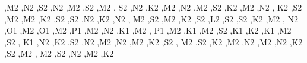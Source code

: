 \begin{DoxyCompactItemize}
\textquotesingle{},\textquotesingle{}M2 \textquotesingle{},\textquotesingle{}N2 \textquotesingle{},\textquotesingle{}S2 \textquotesingle{},\textquotesingle{}N2 \textquotesingle{},\textquotesingle{}M2 \textquotesingle{},\textquotesingle{}S2 \textquotesingle{},\textquotesingle{}M2 \textquotesingle{}, \textquotesingle{}S2 \textquotesingle{},\textquotesingle{}N2 \textquotesingle{},\textquotesingle{}K2 \textquotesingle{},\textquotesingle{}M2 \textquotesingle{},\textquotesingle{}N2 \textquotesingle{},\textquotesingle{}M2 \textquotesingle{},\textquotesingle{}S2 \textquotesingle{},\textquotesingle{}K2 \textquotesingle{},\textquotesingle{}M2 \textquotesingle{},\textquotesingle{}N2 \textquotesingle{}, \textquotesingle{}K2 \textquotesingle{},\textquotesingle{}S2 \textquotesingle{},\textquotesingle{}M2 \textquotesingle{},\textquotesingle{}M2 \textquotesingle{},\textquotesingle{}K2 \textquotesingle{},\textquotesingle{}S2 \textquotesingle{},\textquotesingle{}S2 \textquotesingle{},\textquotesingle{}N2 \textquotesingle{},\textquotesingle{}K2 \textquotesingle{},\textquotesingle{}N2 \textquotesingle{}, \textquotesingle{}M2 \textquotesingle{},\textquotesingle{}S2 \textquotesingle{},\textquotesingle{}M2 \textquotesingle{},\textquotesingle{}K2 \textquotesingle{},\textquotesingle{}S2 \textquotesingle{},\textquotesingle{}L2 \textquotesingle{},\textquotesingle{}S2 \textquotesingle{},\textquotesingle{}S2 \textquotesingle{},\textquotesingle{}K2 \textquotesingle{},\textquotesingle{}M2 \textquotesingle{}, \textquotesingle{}N2 \textquotesingle{},\textquotesingle{}O1 \textquotesingle{},\textquotesingle{}M2 \textquotesingle{},\textquotesingle{}O1 \textquotesingle{},\textquotesingle{}M2 \textquotesingle{},\textquotesingle{}P1 \textquotesingle{},\textquotesingle{}M2 \textquotesingle{},\textquotesingle{}N2 \textquotesingle{},\textquotesingle{}K1 \textquotesingle{},\textquotesingle{}M2 \textquotesingle{}, \textquotesingle{}P1 \textquotesingle{},\textquotesingle{}M2 \textquotesingle{},\textquotesingle{}K1 \textquotesingle{},\textquotesingle{}M2 \textquotesingle{},\textquotesingle{}S2 \textquotesingle{},\textquotesingle{}K1 \textquotesingle{},\textquotesingle{}K2 \textquotesingle{},\textquotesingle{}K1 \textquotesingle{},\textquotesingle{}M2 \textquotesingle{},\textquotesingle{}S2 \textquotesingle{}, \textquotesingle{}K1 \textquotesingle{},\textquotesingle{}N2 \textquotesingle{},\textquotesingle{}K2 \textquotesingle{},\textquotesingle{}S2 \textquotesingle{},\textquotesingle{}N2 \textquotesingle{},\textquotesingle{}M2 \textquotesingle{},\textquotesingle{}N2 \textquotesingle{},\textquotesingle{}M2 \textquotesingle{},\textquotesingle{}K2 \textquotesingle{},\textquotesingle{}S2 \textquotesingle{}, \textquotesingle{}M2 \textquotesingle{},\textquotesingle{}S2 \textquotesingle{},\textquotesingle{}K2 \textquotesingle{},\textquotesingle{}M2 \textquotesingle{},\textquotesingle{}N2 \textquotesingle{},\textquotesingle{}M2 \textquotesingle{},\textquotesingle{}N2 \textquotesingle{},\textquotesingle{}K2 \textquotesingle{},\textquotesingle{}S2 \textquotesingle{},\textquotesingle{}M2 \textquotesingle{}, \textquotesingle{}M2 \textquotesingle{},\textquotesingle{}S2 \textquotesingle{},\textquotesingle{}N2 \textquotesingle{},\textquotesingle{}M2 \textquotesingle{},\textquotesingle{}K2 
\end{DoxyCompactItemize}
